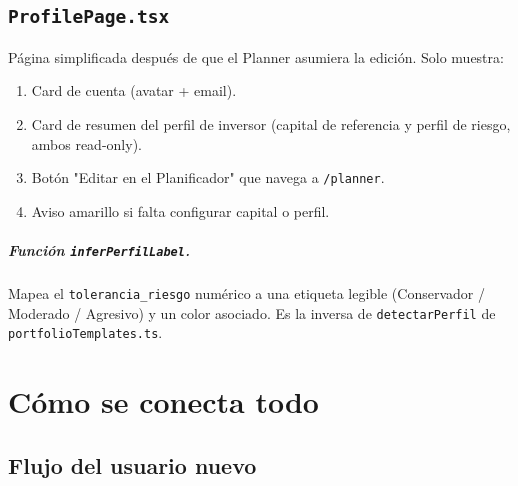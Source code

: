 \documentclass[11pt,a4paper]{book}
\begin{document}
\section{\texttt{ProfilePage.tsx}}

Página simplificada después de que el Planner asumiera la edición. Solo muestra:
\begin{enumerate}
  \item Card de cuenta (avatar + email).
  \item Card de resumen del perfil de inversor (capital de referencia y perfil de riesgo, ambos read-only).
  \item Botón "Editar en el Planificador" que navega a \texttt{/planner}.
  \item Aviso amarillo si falta configurar capital o perfil.
\end{enumerate}

\paragraph{Función \texttt{inferPerfilLabel}.} Mapea el \texttt{tolerancia\_riesgo} numérico a una etiqueta legible (Conservador / Moderado / Agresivo) y un color asociado. Es la inversa de \texttt{detectarPerfil} de \texttt{portfolioTemplates.ts}.

\chapter{Cómo se conecta todo}

\section{Flujo del usuario nuevo}
\end{document}
